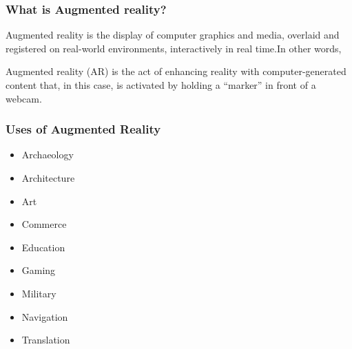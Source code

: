 \documentclass{article}
\begin{document}

\subsubsection{What is Augmented reality? }\cite{klein}
\par Augmented reality is the display of computer graphics and media, overlaid and registered on real-world environments, interactively in real time.{\small{In other words,}}
\par Augmented reality (AR) is the act of enhancing reality with computer-generated content that, in this case, is activated by holding a “marker” in front of a webcam.

\subsubsection{Uses of Augmented Reality}
\begin{itemize}
\item Archaeology
\item Architecture
\item Art
\item Commerce
\item Education
\item Gaming
\item Military
\item Navigation
\item Translation
\end{itemize}
\end{document}
